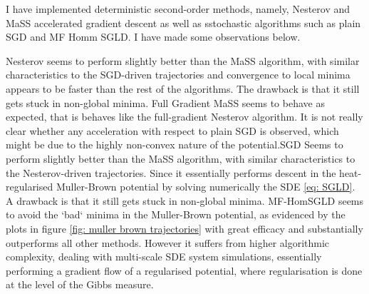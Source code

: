 \documentclass{article}
\begin{document}
I have implemented deterministic second-order methods, namely, Nesterov and MaSS accelerated gradient descent as well as sstochastic algorithms such as plain SGD and MF Homm SGLD. I have made some observations below.

Nesterov seems to perform slightly better than the MaSS algorithm, with similar characteristics to the SGD-driven trajectories and convergence to local minima appears to be faster than the rest of the algorithms. The drawback is that it still gets stuck in non-global minima. Full Gradient MaSS seems to behave as expected, that is behaves like the full-gradient Nesterov algorithm. It is not really clear whether any acceleration with respect to plain SGD is observed, which might be due to the highly non-convex nature of the potential.SGD  Seems to perform slightly better than the MaSS algorithm, with similar characteristics to the Nesterov-driven trajectories. Since it essentially performs descent in the heat-regularised Muller-Brown potential by solving numerically the SDE \ref{eq: SGLD}. A drawback is that it still gets stuck in non-global minima. MF-HomSGLD seems to avoid the `bad` minima in the Muller-Brown potential, as evidenced by the plots in figure \ref{fig: muller brown trajectories} with great efficacy and substantially outperforms all other methods. However it suffers from higher algorithmic complexity, dealing with multi-scale SDE system simulations, essentially performing a gradient flow of a regularised potential, where regularisation is done at the level of the Gibbs measure.
\end{document}

